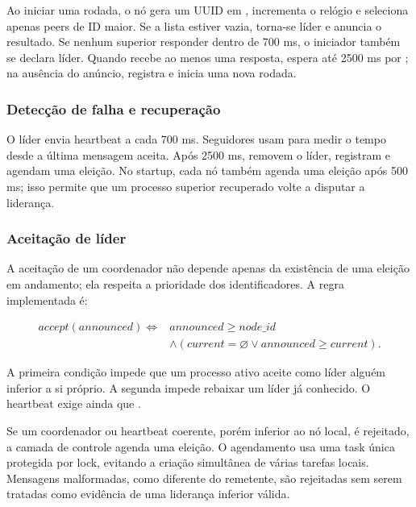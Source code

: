 Ao iniciar uma rodada, o nó gera um UUID em , incrementa o relógio e seleciona apenas peers de ID maior. Se a lista estiver vazia, torna-se líder e anuncia o resultado. Se nenhum superior responder dentro de 700 ms, o iniciador também se declara líder. Quando recebe ao menos uma resposta, espera até 2500 ms por ; na ausência do anúncio, registra  e inicia uma nova rodada.

\subsubsection{Detecção de falha e recuperação}

O líder envia heartbeat a cada 700 ms. Seguidores usam  para medir o tempo desde a última mensagem aceita. Após 2500 ms, removem o líder, registram  e agendam uma eleição. No startup, cada nó também agenda uma eleição após 500 ms; isso permite que um processo superior recuperado volte a disputar a liderança.

\subsubsection{Aceitação de líder}

A aceitação de um coordenador não depende apenas da existência de uma eleição em andamento; ela respeita a prioridade dos identificadores. A regra implementada é:

\begin{equation}
\begin{split}
    accept(announced) \Leftrightarrow {} & announced \geq node\_id \\
    & \land (current = \varnothing \lor announced \geq current).
\end{split}
\label{eq:accept-leader}
\end{equation}

A primeira condição impede que um processo ativo aceite como líder alguém inferior a si próprio. A segunda impede rebaixar um líder já conhecido. O heartbeat exige ainda que .

Se um coordenador ou heartbeat coerente, porém inferior ao nó local, é rejeitado, a camada de controle agenda uma eleição. O agendamento usa uma task única protegida por lock, evitando a criação simultânea de várias tarefas locais. Mensagens malformadas, como  diferente do remetente, são rejeitadas sem serem tratadas como evidência de uma liderança inferior válida.

